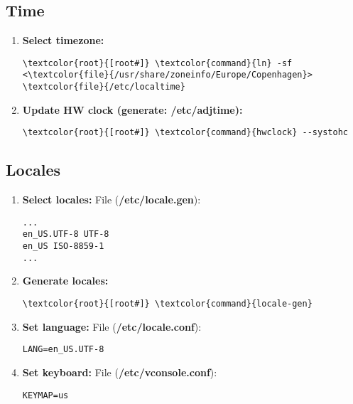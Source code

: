 \documentclass[10pt, a4paper, onecolumn, openany]{book} %
\begin{document}
\subsection{Time}
\begin{enumerate}
    \item \textbf{Select timezone:}
\begin{Verbatim}[commandchars=\\\{\}]
\textcolor{root}{[root#]} \textcolor{command}{ln} -sf <\textcolor{file}{/usr/share/zoneinfo/Europe/Copenhagen}> \textcolor{file}{/etc/localtime}
\end{Verbatim}
        \item \textbf{Update HW clock (generate: /etc/adjtime):}
\begin{Verbatim}[commandchars=\\\{\}]
\textcolor{root}{[root#]} \textcolor{command}{hwclock} --systohc
\end{Verbatim}
\end{enumerate}
\subsection{Locales}
    \begin{enumerate}
        \item \textbf{Select locales:}
\newline File (\textbf{\textcolor{file}{/etc/locale.gen}}):
\begin{Verbatim}[commandchars=\\\{\}]
...
en_US.UTF-8 UTF-8
en_US ISO-8859-1
...
\end{Verbatim}
        \item \textbf{Generate locales:}
\begin{Verbatim}[commandchars=\\\{\}]
\textcolor{root}{[root#]} \textcolor{command}{locale-gen}
\end{Verbatim}      
        \item \textbf{Set language:}
\newline File (\textbf{\textcolor{file}{/etc/locale.conf}}):
\begin{Verbatim}[commandchars=\\\{\}]
LANG=en_US.UTF-8
\end{Verbatim}
        \item \textbf{Set keyboard:}
\newline File (\textbf{\textcolor{file}{/etc/vconsole.conf}}):
\begin{Verbatim}[commandchars=\\\{\}]
KEYMAP=us
\end{Verbatim}
    \end{enumerate}
\end{document}
